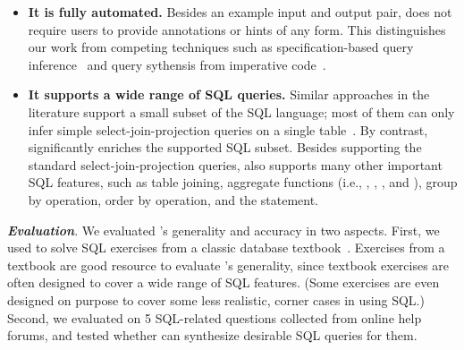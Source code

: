 \begin{itemize}
\item \textbf{It is fully automated.} Besides
an example input and output pair,
\ourtool does not require users to provide
annotations or hints of any form. 
This distinguishes our work from competing techniques such as
specification-based query inference~\cite{Zloof:1975} and
query sythensis from imperative code~\cite{abs-1208-2013}.

\item \textbf{It supports a wide range of SQL queries.}
Similar approaches in the literature support
a small subset of the SQL language; most of them
can only infer simple select-join-projection
queries on a single table~\cite{Zloof:1975, DasSarma:2010, Tran:2009, DasSarma:2010, abs-1208-2013}. By contrast, 
\ourtool significantly enriches the supported SQL subset.
Besides supporting the standard select-join-projection
queries, \ourtool also supports many other important
SQL features, such as table joining,
aggregate functions (i.e., , , ,
and ), group by operation,
order by operation, and the 
statement. 
\end{itemize}






\vspace{1mm}
\noindent \textbf{\textit{Evaluation}}.
We evaluated \ourtool's generality and accuracy
in two aspects. First, we used \ourtool to solve
\exnum SQL exercises from a classic database textbook~\cite{cowbook}. 
Exercises from a textbook are good resource
to evaluate \ourtool's generality, since textbook
exercises are often designed to cover a wide range of SQL features.
(Some exercises are even designed on purpose to cover some less realistic,
corner cases in using SQL.)
Second, we evaluated \ourtool on 5 SQL-related questions collected 
from online help forums, and tested whether
\ourtool can synthesize desirable SQL queries for them.

